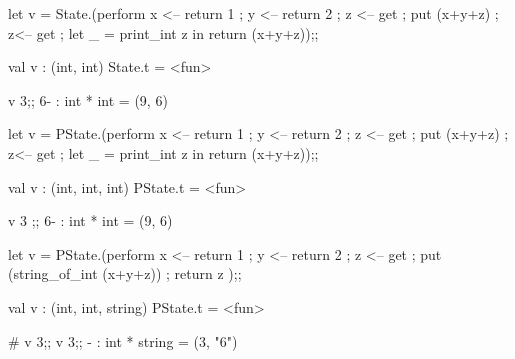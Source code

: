 \begin{enumerate}
\begin{ocamlcode}
let v = State.(perform x <-- return 1 ; y <-- return 2 ; z <-- get ; put (x+y+z) ; 
  z<-- get ; let _ = print_int z in return (x+y+z));;
\end{ocamlcode}
\begin{ocamlcode}
 val v : (int, int) State.t = <fun>  
\end{ocamlcode}

\begin{alternate}
  v 3;;
6- : int * int = (9, 6)
\end{alternate}


\begin{ocamlcode}
let v = PState.(perform x <-- return 1 ; y <-- return 2 ; z <-- get ; put (x+y+z) ; 
z<-- get ; let _ = print_int z in return (x+y+z));;
\end{ocamlcode}

\begin{ocamlcode}
val v : (int, int, int) PState.t = <fun>
\end{ocamlcode}

\begin{alternate}
v 3 ;;
6- : int * int = (9, 6)  
\end{alternate}

\begin{ocamlcode}
let v = PState.(perform x <-- return 1 ; y <-- return 2 ; z <-- get ; 
put (string_of_int (x+y+z)) ; return z );;
\end{ocamlcode}
\begin{ocamlcode}
val v : (int, int, string) PState.t = <fun>
\end{ocamlcode}

\begin{alternate}
# v 3;;
v 3;;
- : int * string = (3, "6")
\end{alternate}

\end{enumerate}


